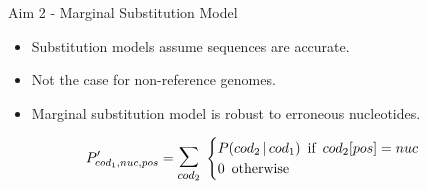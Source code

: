 \documentclass[aspectratio=169]{beamer}
\begin{document}
\begin{frame}{Aim 2 - Marginal Substitution Model} %
\begin{itemize}
	\setlength\itemsep{1em}
	\item Substitution models assume sequences are accurate.
	\item Not the case for non-reference genomes.
	\item Marginal substitution model is robust to erroneous nucleotides.
\end{itemize}
\vspace{2em}

\[P'_{cod_1,nuc,pos} = \mathlarger{\mathlarger{\sum}}_{cod_2} \thickspace \begin{cases}
	P(cod_2 \thinspace | \thinspace cod_1) \enspace \text{if} \enspace cod_2[pos] = nuc\\
	0 \enspace \text{otherwise}
\end{cases} \]

\end{frame} %
\end{document}
